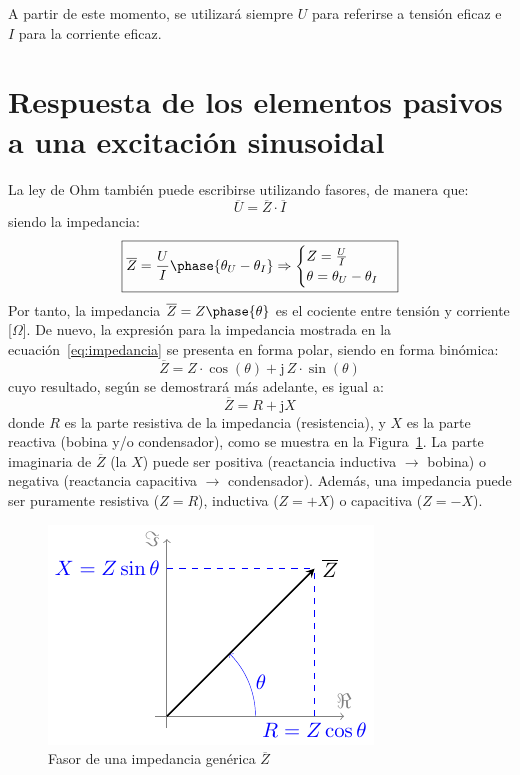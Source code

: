 \begin{remark}
  A partir de este momento, se utilizará siempre $U$ para referirse a
  tensión eficaz e $I$ para la corriente eficaz.
\end{remark}
	
\section{Respuesta de los elementos pasivos a una excitación
  sinusoidal}
	
La ley de Ohm también puede escribirse utilizando fasores, de manera
que:
\begin{equation}\label{eq:ohm_generalizada}
  \boxed{ \overline{U}=\overline{Z}\cdot\overline{I} }
\end{equation}
siendo la impedancia:
\begin{equation}\label{eq:impedancia}
  \boxed{\overline{Z} = \frac{U}{I}\phase{\theta_U - \theta_I} \Rightarrow 
    \begin{cases}
      Z = \frac{U}{I}\\
      \theta = \theta_U - \theta_I
    \end{cases}}
\end{equation}
Por tanto, la impedancia $\overline{Z}=Z\phase{\theta}$ es el cociente
entre tensión y corriente [$\Omega$]. De nuevo, la expresión para la
impedancia mostrada en la ecuación~\eqref{eq:impedancia} se presenta
en forma polar, siendo en forma binómica:
\begin{equation*}
  \overline{Z} = Z\cdot\cos(\theta)+\mathrm{j}\,Z\cdot\sin(\theta) %
\end{equation*}
cuyo resultado, según se demostrará más adelante, es igual a:
\begin{equation}
  \boxed{\overline{Z} =  R + \mathrm{j} X}
\end{equation}
donde $R$ es la parte resistiva de la impedancia (resistencia), y $X$
es la parte reactiva (bobina y/o condensador), como se muestra en la
Figura~\ref{fig:fasorimpedancia}. La parte imaginaria de
$\overline{Z}$ (la $X$) puede ser positiva (reactancia inductiva
$\rightarrow$ bobina) o negativa (reactancia capacitiva $\rightarrow$
condensador). Además, una impedancia puede ser puramente resistiva
($Z=R$), inductiva ($Z=+X$) o capacitiva ($Z=-X$).
\begin{figure}[H]
  \centering \includegraphics{../figs/fasorImpedancia.pdf}
  \caption{Fasor de una impedancia genérica $\overline{Z}$}
  \label{fig:fasorimpedancia}
\end{figure}
	
